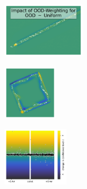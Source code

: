 \begin{figure}[H]
    \begin{subfigure}
        \centering
        \includegraphics[width=0.388\textwidth,valign=t]{ood-detection/figures/ood-synthesis/ood-line-uniform-weighted-difference.pdf}
    \end{subfigure}
    \begin{subfigure}
        \centering
        \includegraphics[width=0.254\textwidth,valign=t]{ood-detection/figures/ood-synthesis/ood-circle-uniform-weighted-difference.pdf}
    \end{subfigure}
    \begin{subfigure}
        \centering
        \includegraphics[width=0.308\textwidth,valign=t]{ood-detection/figures/ood-synthesis/ood-haystack-uniform-weighted-difference.pdf}
    \end{subfigure}


\end{figure}

